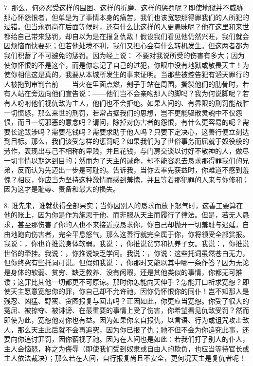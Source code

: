 7. 那么，何必忍受这样的围困、这样的折磨、这样的惩罚呢？即使地狱并不威胁那心怀怨恨者，但单是为了事情本身的痛苦，我们也该宽恕那得罪我们的人所犯的过错。但当永罚尚在后面等候时，还有什么比这样的人更愚昧呢？他在这里和来世都给自己带来惩罚，却自以为是在报复仇敌！假设我们看见他仍然兴旺，我们就会因烦恼而快要死；但若他处境不利，我们又担心会有什么转机发生。但这两者都为我们积蓄了不可避免的惩罚。因为经上说： 不要对我说所受的伤害有多大；因为使你怀恨的不是这个，而是你忘记了自己的过犯，你眼中没有地狱或敬畏天主！为使你相信这是真的，我要从本城所发生的事来证明。当那些被控告犯有滔天罪行的人被拖到审判台前——当火在里面点燃，刽子手站在周围，撕裂他们的肋骨时，若有人站在旁边向他们宣告说：——他们岂不会亲吻那人的脚吗？我为何说脚呢？若有人吩咐他们视仇敌为主人，他们也不会拒绝。如果人间的、有界限的刑罚能战胜一切愤怒，那么来世的刑罚，若常占据我们的思想，岂不更能驱散灵魂中不仅怨恨，而且一切邪恶的意念吗？请问，除掉对伤害者的怨恨，有什么更容易的呢？需要长途跋涉吗？需要花钱吗？需要求助于他人吗？只要下定决心，这善行便立刻达到目标。那么，我们该受怎样的惩罚呢？如果我们为了世俗事务而屈就于奴役般的劳作，表现出与己不相称的卑贱，并且花钱，与门房交谈以讨好不敬神的人，做尽一切事情以期达到目的；然而为了天主的诫命，却不能容忍去恳求那得罪我们的兄弟，反而认为先迈出一步是可耻的。告诉我，当你去率先获益时，你难道不感到羞愧？相反，你应当为坚持这种激情而感到羞愧，并且等着那犯罪的人来与你修和；因为这才是耻辱、责备和最大的损失。\par

8. 谁先来，谁就获得全部果实；当你因别人的恳求而放下怒气时，这善工要算在他的账上，因为你是作为施恩于他、而非服从天主而履行了律法。但是，若无人恳求，甚至那伤害了你的人也不来接近或恳求你，你自己却抛开一切羞耻与迟延，自由地跑向伤害者，完全平息怒气，那么这善行就完全属于你，你将领受全部赏报。我说：，你也许推说身体软弱。我说：，你推说贫穷和抚养子女。我说：，你推说世俗的牵挂。我说：，你推说缺乏学问。我说：，你说：这些托词虽然苍白无力，但你终究有些托词可说。但假如我说：，你那时又能以其中哪一条作答？因为无论是身体的软弱、贫穷、缺乏教养、没有闲暇，还是其他类似的事情，你都无可推诿；这罪比其他一切都更不可原谅。那时你怎能向天伸手？怎能开口祈求宽恕？即使天主愿意宽恕你的罪，你自己却不允许祂，因你仍怀恨你的同仆！岂不知那人是残忍、凶猛、野蛮、贪图报复与回击吗？正因如此，你更应当宽恕。你受了很大的冤屈、被掠夺、被诽谤、在最重要的事情上受了伤害，你希望看见仇敌受罚？然而即使为此，宽恕他对你也有益。因为如果你亲自报仇，以言语、行为或诅咒攻击敌人，那么天主此后就不会再追究，因为你已报了仇；祂不但不会为你追究此事，还要向你追讨罪罚，因你藐视了祂。因为在人间也是如此：若我们打了别人的仆人，主人会恼怒，称之为侮辱（即使我们受到奴隶或自由人的欺负，也应当等待官长或主人依法裁决）；那么若在人间，自行报复尚且不安全，更何况天主是复仇者呢！\par

